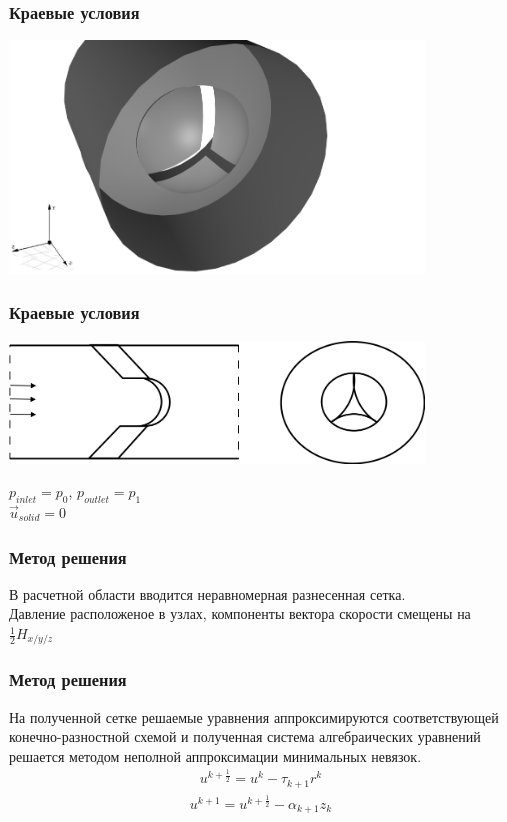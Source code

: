 \documentclass[14pt]{beamer}
\begin{document}
\begin{frame}
\frametitle{Краевые условия}
    \begin{center}
	\includegraphics[width=11cm]{valves_3d.png}
    \end{center}
\end{frame}

\begin{frame}
\frametitle{Краевые условия}
    \begin{center}
	\includegraphics[width=11cm]{complex_valve.png}
    \end{center}
    $p_{inlet}=p_0$, $p_{outlet}=p_1$\\
    $\vec u_{solid}=0$
\end{frame}

\begin{frame}
\frametitle{Метод решения}
В расчетной области вводится неравномерная разнесенная сетка.\\ Давление расположеное в узлах, компоненты вектора скорости смещены на $\frac{1}{2}H_{x/y/z}$
\end{frame}

\begin{frame}
\frametitle{Метод решения}
На полученной сетке решаемые уравнения аппроксимируются соответствующей конечно-разностной схемой и полученная система алгебраических уравнений решается методом неполной аппроксимации минимальных невязок.
\begin{eqnarray}
\label{eq:Alg_first}
u^{k+\frac{1}{2}}=u^k-\tau_{k+1}r^k
\end{eqnarray}
\begin{eqnarray}
\label{eq:Alg_second}
u^{k+1}=u^{k+\frac{1}{2}}-\alpha_{k+1}z_k
\end{eqnarray}
\end{frame}
\end{document}
